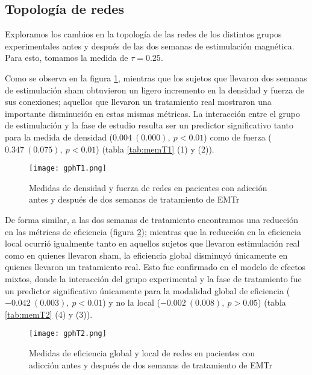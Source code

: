 \subsection{Topología de redes}
Exploramos los cambios en la topología de las redes de los distintos grupos experimentales antes y después de las dos semanas de estimulación magnética. Para esto, tomamos la medida de $\tau = 0.25$. \par
Como se observa en la figura \ref{fig:gpT1}, mientras que los sujetos que llevaron dos semanas de estimulación sham obtuvieron un ligero incremento en la densidad y fuerza de sus conexiones; aquellos que llevaron un tratamiento real mostraron una importante disminución en estas mismas métricas. La interacción entre el grupo de estimulación y la fase de estudio resulta ser un predictor significativo tanto para la medida de densidad ($0.004\ (0.000),\ p<0.01$) como de fuerza ($0.347\ (0.075),\ p<0.01$) (tabla \ref{tab:memT1} (1) y (2)).\par

\begin{figure}[!tb]
    \centering
    \texttt{[image: gphT1.png]}
    \caption{Medidas de densidad y fuerza de redes en pacientes con adicción antes y después de dos semanas de tratamiento de EMTr}
    \label{fig:gpT1}
\end{figure}

De forma similar, a las dos semanas de tratamiento encontramos una reducción en las métricas de eficiencia (figura \ref{fig:gpT2}); mientras que la reducción en la eficiencia local ocurrió igualmente tanto en aquellos sujetos que llevaron estimulación real como en quienes llevaron sham, la eficiencia global disminuyó únicamente en quienes llevaron un tratamiento real. Esto fue confirmado en el modelo de efectos mixtos, donde la interacción del grupo experimental y la fase de tratamiento fue un predictor significativo únicamente para la modalidad global de eficiencia ($-0.042\ (0.003),\ p<0.01$) y no la local ($-0.002\ (0.008),\ p>0.05$) (tabla \ref{tab:memT2} (4) y (3)).\par

\begin{figure}[!htb]
    \centering
    \texttt{[image: gphT2.png]}
    \caption{Medidas de eficiencia global y local de redes en pacientes con adicción antes y después de dos semanas de tratamiento de EMTr}
    \label{fig:gpT2}
\end{figure}

